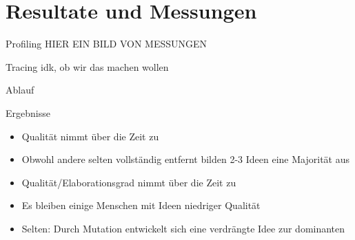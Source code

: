 \section{Resultate und Messungen}
\begin{frame} {Profiling}
	HIER EIN BILD VON MESSUNGEN
\end{frame}

\begin{frame} {Tracing}
	idk, ob wir das machen wollen
\end{frame}

\begin{frame} {Ablauf}
	\begin{figure}[ht]
\end{figure}
\end{frame}

\begin{frame} {Ergebnisse}
	\begin{itemize}
		\item Qualität nimmt über die Zeit zu
		\item Obwohl andere selten vollständig entfernt bilden 2-3 Ideen eine Majorität aus
		\item Qualität/Elaborationsgrad nimmt über die Zeit zu
		\item Es bleiben einige Menschen mit Ideen niedriger Qualität
		\item Selten: Durch Mutation entwickelt sich eine verdrängte Idee zur dominanten
	\end{itemize}
\end{frame}